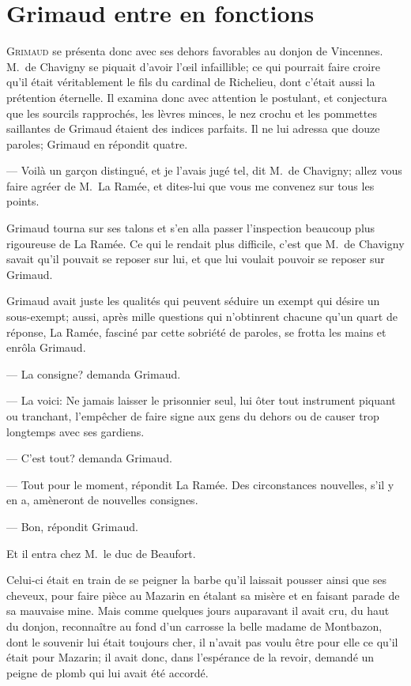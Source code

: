 \chapter{Grimaud entre en fonctions}

\lettrine{G}{rimaud} se présenta donc avec ses dehors favorables au donjon de Vincennes. M.~de Chavigny se piquait d'avoir l'œil infaillible; ce qui pourrait faire croire qu'il était véritablement le fils du cardinal de Richelieu, dont c'était aussi la prétention éternelle. Il examina donc avec attention le postulant, et conjectura que les sourcils rapprochés, les lèvres minces, le nez crochu et les pommettes saillantes de Grimaud étaient des indices parfaits. Il ne lui adressa que douze paroles; Grimaud en répondit quatre.

— Voilà un garçon distingué, et je l'avais jugé tel, dit M.~de Chavigny; allez vous faire agréer de M.~La Ramée, et dites-lui que vous me convenez sur tous les points.

Grimaud tourna sur ses talons et s'en alla passer l'inspection beaucoup plus rigoureuse de La Ramée. Ce qui le rendait plus difficile, c'est que M.~de Chavigny savait qu'il pouvait se reposer sur lui, et que lui voulait pouvoir se reposer sur Grimaud.

Grimaud avait juste les qualités qui peuvent séduire un exempt qui désire un sous-exempt; aussi, après mille questions qui n'obtinrent chacune qu'un quart de réponse, La Ramée, fasciné par cette sobriété de paroles, se frotta les mains et enrôla Grimaud.

— La consigne? demanda Grimaud.

— La voici: Ne jamais laisser le prisonnier seul, lui ôter tout instrument piquant ou tranchant, l'empêcher de faire signe aux gens du dehors ou de causer trop longtemps avec ses gardiens.

— C'est tout? demanda Grimaud.

— Tout pour le moment, répondit La Ramée. Des circonstances nouvelles, s'il y en a, amèneront de nouvelles consignes.

— Bon, répondit Grimaud.

Et il entra chez M.~le duc de Beaufort.

Celui-ci était en train de se peigner la barbe qu'il laissait pousser ainsi que ses cheveux, pour faire pièce au Mazarin en étalant sa misère et en faisant parade de sa mauvaise mine. Mais comme quelques jours auparavant il avait cru, du haut du donjon, reconnaître au fond d'un carrosse la belle madame de Montbazon, dont le souvenir lui était toujours cher, il n'avait pas voulu être pour elle ce qu'il était pour Mazarin; il avait donc, dans l'espérance de la revoir, demandé un peigne de plomb qui lui avait été accordé.

